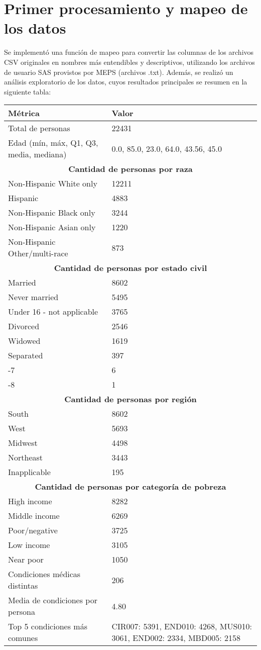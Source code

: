 \documentclass[12pt]{article}
\begin{document}
\section{Primer procesamiento y mapeo de los datos}
Se implementó una función de mapeo para convertir las columnas de los archivos CSV originales en nombres más entendibles y descriptivos, utilizando los archivos de usuario SAS provistos por MEPS (archivos .txt). Además, se realizó un análisis exploratorio de los datos, cuyos resultados principales se resumen en la siguiente tabla:

\begin{longtable}{|l|l|}
\hline
\textbf{Métrica} & \textbf{Valor} \\
\hline
Total de personas & 22431 \\
Edad (mín, máx, Q1, Q3, media, mediana) & 0.0, 85.0, 23.0, 64.0, 43.56, 45.0 \\
\hline
\multicolumn{2}{|c|}{\textbf{Cantidad de personas por raza}} \\
\hline
Non-Hispanic White only & 12211 \\
Hispanic & 4883 \\
Non-Hispanic Black only & 3244 \\
Non-Hispanic Asian only & 1220 \\
Non-Hispanic Other/multi-race & 873 \\
\hline
\multicolumn{2}{|c|}{\textbf{Cantidad de personas por estado civil}} \\
\hline
Married & 8602 \\
Never married & 5495 \\
Under 16 - not applicable & 3765 \\
Divorced & 2546 \\
Widowed & 1619 \\
Separated & 397 \\
-7 & 6 \\
-8 & 1 \\
\hline
\multicolumn{2}{|c|}{\textbf{Cantidad de personas por región}} \\
\hline
South & 8602 \\
West & 5693 \\
Midwest & 4498 \\
Northeast & 3443 \\
Inapplicable & 195 \\
\hline
\multicolumn{2}{|c|}{\textbf{Cantidad de personas por categoría de pobreza}} \\
\hline
High income & 8282 \\
Middle income & 6269 \\
Poor/negative & 3725 \\
Low income & 3105 \\
Near poor & 1050 \\
\hline
Condiciones médicas distintas & 206 \\
Media de condiciones por persona & 4.80 \\
Top 5 condiciones más comunes & CIR007: 5391, END010: 4268, MUS010: 3061, END002: 2334, MBD005: 2158 \\
\hline
\end{longtable}
\end{document}
